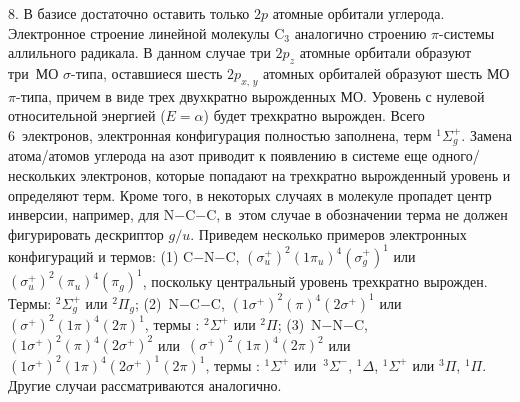 8. В базисе достаточно оставить только $2p$ атомные орбитали углерода. Электронное строение линейной молекулы $\text{C}_3$ аналогично строению $\pi$-системы аллильного радикала. В данном случае три $2p_z$ атомные орбитали образуют три~МО $\sigma$-типа, оставшиеся шесть $2p_{x,\,y}$ атомных орбиталей образуют шесть МО $\pi$-типа, причем в виде трех двухкратно вырожденных МО. Уровень с нулевой относительной энергией ($E=\alpha$) будет трехкратно вырожден. Всего 6~электронов, электронная конфигурация полностью заполнена, терм $^1\Sigma^+_g$. Замена атома/атомов углерода на азот приводит к появлению в системе еще одного/нескольких электронов, которые попадают на трехкратно вырожденный уровень и определяют терм. Кроме того, в некоторых случаях в молекуле пропадет центр инверсии, например, для N$-$C$-$C, в~этом случае в обозначении терма не должен фигурировать дескриптор $g/u$. Приведем несколько примеров электронных конфигураций и термов: (1) C$-$N$-$C, $(\sigma^+_u)^2(1\pi_u)^4(\sigma^+_g)^1$ или~$(\sigma^+_u)^2(\pi_u)^4(\pi_g)^1$, поскольку центральный уровень трехкратно вырожден. Термы: $^2\Sigma^+_g$ или $^2\Pi_g$; (2)~N$-$C$-$C, $(1\sigma^+)^2(\pi)^4(2\sigma^+)^1$ или $(\sigma^+)^2(1\pi)^4(2\pi)^1$, термы : $^2\Sigma^+$ или $^2\Pi$; (3)~N$-$N$-$C, $(1\sigma^+)^2(\pi)^4(2\sigma^+)^2$ или~$(\sigma^+)^2(1\pi)^4(2\pi)^2$ или $(1\sigma^+)^2(1\pi)^4(2\sigma^+)^1(2\pi)^1$, термы : $^1\Sigma^+$ или~$^3\Sigma^-$, $^1\Delta$, $^1\Sigma^+$ или $^3\Pi$, $^1\Pi$. Другие случаи рассматриваются аналогично.\par
\newpage


